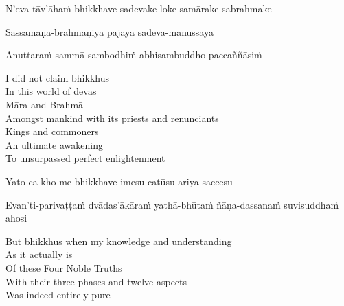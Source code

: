 \begin{pali-hang-first-line}
N'eva tāv'āhaṁ bhikkhave sadevake loke samārake sabrahmake
\end{pali-hang-first-line}
\begin{pali-hang-together}
Sassamaṇa-brāhmaṇiyā pajāya sadeva-manussāya
\end{pali-hang-together}
\begin{pali-hang-together}
Anuttaraṁ sammā-sambodhiṁ abhisambuddho\makeatletter\hyperlink{endnote58-appendix}\makeatother \thinspace
paccaññāsiṁ
\end{pali-hang-together}

\ifbfive\enlargethispage{1\baselineskip}\fi

\begin{english-verses}
  I did not claim bhikkhus\\
  In this world of devas\\
  Māra and Brahmā\\
  Amongst mankind with its priests and renunciants\\
  Kings and commoners\\
  An ultimate awakening\\
  To unsurpassed perfect enlightenment
\end{english-verses}

Yato ca kho me bhikkhave imesu catūsu ariya-saccesu
\begin{pali-hang-together}
  Evan'ti-parivaṭṭaṁ dvādas'ākāraṁ yathā-bhūtaṁ ñāṇa-dassanaṁ suvisuddhaṁ ahosi
\end{pali-hang-together}

\begin{english-verses}
  But bhikkhus when \ifdigital\makeatletter\hyperlink{endnote159-appendix}\makeatother \thinspace\fi my knowledge and understanding\\
  As it actually is\\
  Of these Four Noble Truths\\
  With their three phases and twelve aspects\\
  Was indeed entirely pure
\end{english-verses}

